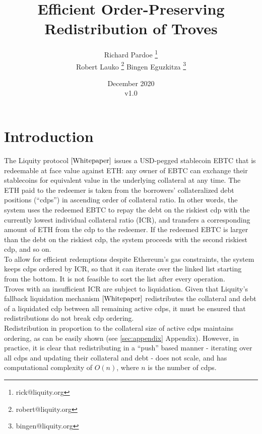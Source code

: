 \documentclass[reqno]{article}
\begin{document}
\title{\textbf{Efficient Order-Preserving Redistribution of Troves}}
\author{Richard Pardoe \thanks{rick@liquity.org}\\[1ex]
  Robert Lauko \thanks{robert@liquity.org} \hspace{2cm}
  Bingen Eguzkitza \thanks{bingen@liquity.org}
}
\date{December 2020\\v1.0}
\maketitle

\tableofcontents

\section{Introduction}


The Liquity protocol $\cite{Whitepaper}$ issues a USD-pegged stablecoin EBTC that is redeemable at face value against ETH: any owner of EBTC can exchange their stablecoins for equivalent value in the underlying collateral at any time. The ETH paid to the redeemer is taken from the borrowers' collateralized debt positions (“cdps”) in ascending order of collateral ratio. In other words, the system uses the redeemed EBTC to repay the debt on the riskiest cdp with the currently lowest individual collateral ratio (ICR), and transfers a corresponding amount of ETH from the cdp to the redeemer. If the redeemed EBTC is larger than the debt on the riskiest cdp, the system proceeds with the second riskiest cdp, and so on. \\

To allow for efficient redemptions despite Ethereum's gas constraints, the system keeps cdps ordered by ICR, so that it can iterate over the linked list starting from the bottom. It is not feasible to sort the list after every operation. \\

Troves with an insufficient ICR are subject to liquidation. Given that Liquity's fallback liquidation mechanism $\cite{Whitepaper}$ redistributes the collateral and debt of a liquidated cdp between all remaining active cdps, it must be ensured that redistributions do not break cdp ordering. \\

Redistribution in proportion to the collateral size of active cdps maintains ordering, as can be easily shown (see \ref{sec:appendix} Appendix). However, in practice, it is clear that redistributing in a “push” based manner - iterating over all cdps and updating their collateral and debt - does not scale, and has computational complexity of $O(n)$, where $n$ is the number of cdps. \\
\end{document}
